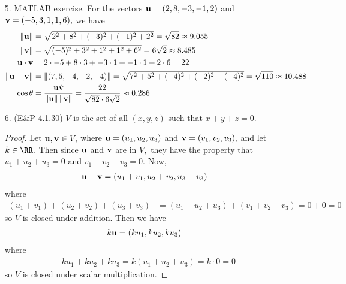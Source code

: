 \documentclass{article}
\newcommand{\vu}{{\bf u}}
\newcommand{\vv}{{\bf v}}
\begin{document}
\begin{itemize}
\begin{enumerate}[(a)]
			\item Show that the vectors $\vu_{\parallel}$ and $\vu_{\bot}$ you obtained in part (a) are orthogonal.
				\begin{proof}
					The dot product between orthogonal vector is 0, and here
					\begin{align*}
						\vu_{\parallel}\cdot\vu_{\bot} &= \left( -\frac{4}{3}, \frac{10}{3}, \frac{8}{3} \right)\cdot \left( \frac{7}{3}, \frac{2}{3}, \frac{1}{3} \right) = -\frac{4}{3}\cdot\frac{7}{3} + \frac{10}{3}\cdot \frac{2}{3} + \frac{8}{3}\cdot \frac{1}{3} = \frac{-28}{3} + \frac{20}{3} + \frac{8}{3} = 0
					\end{align*}
					so these two vectors are orthogonal, as desired.
				\end{proof}

		\end{enumerate}

	\item[5.] MATLAB exercise. For the vectors $\vu = (2, 8, -3, -1, 2)$ and $\vv = (-5, 3, 1, 1, 6),$ we have
		\begin{align*}
			\left\lVert \vu \right\rVert &= \sqrt{2^2+8^2+(-3)^2+(-1)^2+2^2} = \sqrt{82}\approx 9.055 \\
			\left\lVert \vv \right\rVert &= \sqrt{(-5)^2 + 3^2 + 1^2+1^2+6^2} = 6\sqrt{2} \approx8.485 \\
			\vu\cdot\vv &= 2\cdot-5 + 8\cdot3 + -3\cdot1 + -1\cdot 1 + 2\cdot 6 = 22 \\
			\left\lVert \vu-\vv \right\rVert &= \left\lVert (7, 5, -4, -2, -4) \right\rVert = \sqrt{7^2+5^2+(-4)^2+(-2)^2+(-4)^2} = \sqrt{110} \approx10.488 \\
			\cos \theta &= \frac{\vu\dot \vv}{\left\lVert \vu \right\rVert\left\lVert \vv \right\rVert} = \frac{22}{\sqrt{82}\cdot 6\sqrt{2}} \approx0.286
		\end{align*}

	\item[6.] (E\&P 4.1.30) $V$ is the set of all $(x, y, z)$ such that $x+y+z=0.$
		\begin{proof}
			Let $\vu, \vv\in V,$ where $\vu = (u_1, u_2, u_3)$ and $\vv=(v_1, v_2, v_3),$ and let $k\in\RR.$ Then since $\vu$ and $\vv$ are in $V,$ they have the property that $u_1+u_2+u_3=0$ and $v_1+v_2+v_3 = 0.$ Now,
			\begin{align*}
				\vu + \vv &= \left( u_1+v_1, u_2+v_2, u_3+v_3 \right)
			\end{align*}
			where
			\begin{align*}
				(u_1+v_1) + (u_2+v_2) + (u_3+v_3) &= (u_1+u_2+u_3) + (v_1+v_2+v_3) = 0 + 0 = 0
			\end{align*}
			so $V$ is closed under addition. Then we have
			\begin{align*}
				k\vu &= (ku_1, ku_2, ku_3)
			\end{align*}
			where
			\begin{align*}
				ku_1 + ku_2 + ku_3 = k(u_1+u_2+u_3) = k\cdot 0 = 0
			\end{align*}
			so $V$ is closed under scalar multiplication.
		\end{proof}


\end{itemize}
\end{document}
